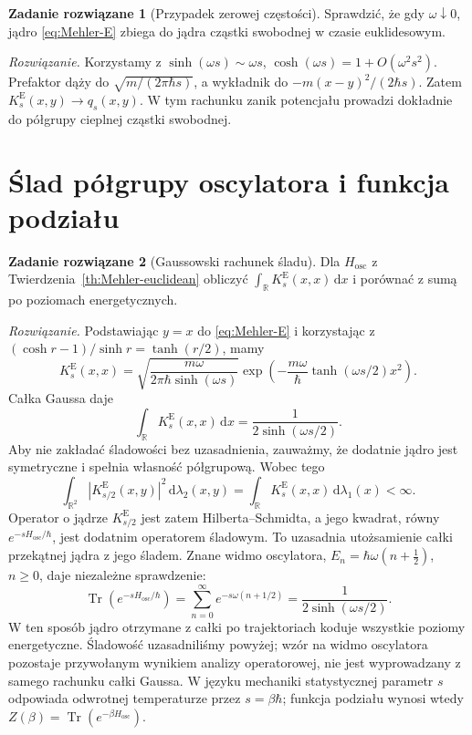 \documentclass[11pt,a4paper,oneside]{report}
\numberwithin{equation}{chapter}
\theoremstyle{plain}
\theoremstyle{definition}
\newtheorem{zadanie}{Zadanie rozwiązane}[chapter]
\theoremstyle{remark}
\newcommand{\R}{\mathbb{R}}
\newcommand{\dd}{\mathrm{d}}
\begin{document}
\begin{zadanie}[Przypadek zerowej częstości]
Sprawdzić, że gdy $\omega\downarrow0$, jądro
\eqref{eq:Mehler-E} zbiega do jądra cząstki swobodnej
w czasie euklidesowym.

\emph{Rozwiązanie.} Korzystamy z
$\sinh(\omega s)\sim\omega s$,
$\cosh(\omega s)=1+O(\omega^2s^2)$.
Prefaktor dąży do $\sqrt{m/(2\pi\hbar s)}$,
a wykładnik do $-m(x-y)^2/(2\hbar s)$.
Zatem $K_s^{\mathrm E}(x,y)\to q_s(x,y)$.
W tym rachunku zanik potencjału prowadzi dokładnie do
półgrupy cieplnej cząstki swobodnej.
\end{zadanie}


\section{Ślad półgrupy oscylatora i funkcja podziału}\label{sec:volIII:16:07}

\begin{zadanie}[Gaussowski rachunek śladu]
Dla $H_{\mathrm{osc}}$ z
Twierdzenia~\ref{th:Mehler-euclidean} obliczyć
$\int_{\R}K_s^{\mathrm E}(x,x)\,\dd x$ i porównać
z sumą po poziomach energetycznych.

\emph{Rozwiązanie.} Podstawiając $y=x$ do
\eqref{eq:Mehler-E} i korzystając z
$(\cosh r-1)/\sinh r=\tanh(r/2)$, mamy
\[
 K_s^{\mathrm E}(x,x)=
 \sqrt{\frac{m\omega}{2\pi\hbar\sinh(\omega s)}}
 \exp\left(-\frac{m\omega}{\hbar}
     \tanh(\omega s/2)x^2\right).
\]
Całka Gaussa daje
\[
 \int_{\R}K_s^{\mathrm E}(x,x)\,\dd x
 =\frac1{2\sinh(\omega s/2)}.
\]
Aby nie zakładać śladowości bez uzasadnienia,
zauważmy, że dodatnie jądro jest symetryczne i spełnia
własność półgrupową. Wobec tego
\[
\int_{\R^2}|K_{s/2}^{\mathrm E}(x,y)|^2\,
\dd\lambda_2(x,y)=\int_{\R}K_s^{\mathrm E}(x,x)\,
\dd\lambda_1(x)<\infty.
\]
Operator o jądrze $K_{s/2}^{\mathrm E}$ jest zatem
Hilberta--Schmidta, a jego kwadrat, równy
$e^{-sH_{\mathrm{osc}}/\hbar}$, jest dodatnim
operatorem śladowym. To uzasadnia utożsamienie
całki przekątnej jądra z jego śladem.
Znane widmo oscylatora,
$E_n=\hbar\omega(n+\frac12)$, $n\ge0$,
daje niezależne sprawdzenie:
\[
 \operatorname{Tr}(e^{-sH_{\mathrm{osc}}/\hbar})
 =\sum_{n=0}^\infty e^{-s\omega(n+1/2)}
 =\frac1{2\sinh(\omega s/2)}.
\]
W ten sposób jądro otrzymane z całki po trajektoriach
koduje wszystkie poziomy energetyczne. Śladowość
uzasadniliśmy powyżej; wzór na widmo oscylatora
pozostaje przywołanym wynikiem analizy operatorowej,
nie jest wyprowadzany z samego rachunku całki Gaussa.
W języku mechaniki statystycznej parametr $s$ odpowiada
odwrotnej temperaturze przez $s=\beta\hbar$;
funkcja podziału wynosi wtedy
$Z(\beta)=\operatorname{Tr}(e^{-\beta H_{\mathrm{osc}}})$.
\end{zadanie}
\end{document}
